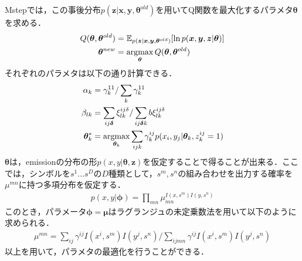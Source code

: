 Mstepでは，この事後分布$p(\bm{z}|\bm{x},\bm{y},\bm{\theta}^{old})$を用いてQ関数を最大化するパラメタ$\bm{\theta}$を求める．
\begin{align}
Q(\bm{\theta}, \bm{\theta}^{old})&=
\mathbb{E}_{ p(\bm{z}|\bm{x},\bm{y},\bm{\theta}^{old})}
[\ln p(\bm{x},\bm{y},\bm{z}|\bm{\theta})]\\
\bm{\theta}^{new} &= \mathop{\rm argmax}\limits_{\bm{\theta}} Q(\bm{\theta}, \bm{\theta}^{old})
\end{align}
それぞれのパラメタは以下の通り計算できる．
\begin{align}
  \alpha_k &= \gamma^{11}_k / \sum_k \gamma^{11}_k\\
  \beta_{lk} &= \sum_{ij \bm{\delta}} \xi^{ij\delta}_{lk} / 
               \sum_{ij \bm{\delta}k}b\xi^{ij\delta}_{lk} \\
  \bm{\theta}^*_k &= \mathop{\rm argmax}\limits_{\bm{\theta}_k} \sum_{ijk} \gamma^{ij}_k p(x_i, y_j|\bm{\theta}_k, z^{ij}_k = 1)
\end{align}
$\bm{\theta}$は，emissionの分布の形$p(x,y|\bm{\theta}, \bm{z})$を仮定することで得ることが出来る．ここでは，シンボルを$s^{1}...s^D$の$D$種類として，$s^m,s^n$の組み合わせを出力する確率を$\mu^{mn}$に持つ多項分布を仮定する．
\begin{align}
p(x,y| \bm{\phi}) = \prod_{mn} \mu_{mn}^{I(x, s^m) I(y, s^n)}
\end{align}
このとき，パラメータ$\bm{\phi} = \bm{\mu}$はラグランジュの未定乗数法を用いて以下のように求められる．
\begin{align}
  \mu^{mn} = \sum_{ij} \gamma^{ij} I(x^i, s^m) I(y^j, s^n)/ \sum_{ijmn} \gamma^{ij} I(x^i, s^m) I(y^j, s^n)
\end{align}
以上を用いて，パラメタの最適化を行うことができる．
